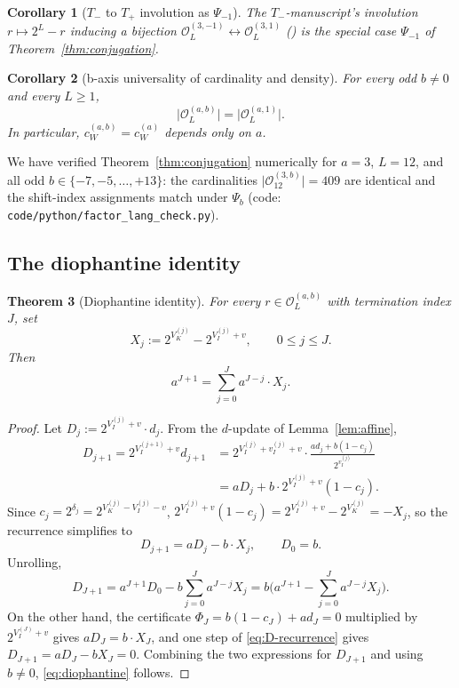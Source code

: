 \documentclass[11pt,reqno]{amsart}
\theoremstyle{plain}
\newtheorem{theorem}{Theorem}[section]
\newtheorem{corollary}[theorem]{Corollary}
\theoremstyle{definition}
\theoremstyle{remark}
\newcommand{\Tneg}{T_{-}}
\newcommand{\Tpos}{T_{+}}
\newcommand{\Obs}{\mathcal{O}}
\newcommand{\Vk}{V_{K}}
\newcommand{\Vi}{V_{I}}
\newcommand{\vi}{v_{I}}
\newcommand{\Psib}{\Psi_{b}}
\newcommand{\cWa}{c_{W}^{(a)}}
\newcommand{\cWab}{c_{W}^{(a,b)}}
\newcommand{\Obsab}{\Obs_{L}^{(a,b)}}
\newcommand{\srcpath}[1]{\nolinkurl{#1}}
\begin{document}
\begin{corollary}[$\Tneg$ to $\Tpos$ involution as $\Psi_{-1}$]\label{cor:involution}
The $\Tneg$-manuscript's involution $r \mapsto 2^L - r$ inducing a bijection
$\Obs_L^{(3,-1)} \leftrightarrow \Obs_L^{(3,1)}$
(\cite[Section~7]{ObstructionResidues2026}) is the special case $\Psi_{-1}$ of
Theorem~\ref{thm:conjugation}.
\end{corollary}

\begin{corollary}[b-axis universality of cardinality and density]\label{cor:b-universality}
For every odd $b \ne 0$ and every $L \ge 1$,
\[
\lvert \Obsab \rvert = \lvert \Obs_L^{(a,1)} \rvert.
\]
In particular, $\cWab = \cWa$ depends only on $a$.
\end{corollary}

We have verified Theorem~\ref{thm:conjugation} numerically for
$a = 3$, $L = 12$, and all odd $b \in \{-7, -5, \ldots, +13\}$: the
cardinalities $\lvert \Obs_{12}^{(3, b)} \rvert = 409$ are identical and
the shift-index assignments match under $\Psib$
(code: \srcpath{code/python/factor_lang_check.py}).

\subsection{The diophantine identity}

\begin{theorem}[Diophantine identity]\label{thm:diophantine}
For every $r \in \Obsab$ with termination index $J$, set
\[
X_j := 2^{\Vk^{(j)}} - 2^{\Vi^{(j)} + v}, \qquad 0 \le j \le J.
\]
Then
\begin{equation}\label{eq:diophantine}
a^{J+1} = \sum_{j=0}^{J} a^{J-j} \cdot X_j.
\end{equation}
\end{theorem}

\begin{proof}
Let $D_j := 2^{\Vi^{(j)} + v} \cdot d_j$. From the $d$-update of
Lemma~\ref{lem:affine},
\begin{align*}
D_{j+1} = 2^{\Vi^{(j+1)} + v} d_{j+1}
  &= 2^{\Vi^{(j)} + \vi^{(j)} + v} \cdot \frac{a d_j + b(1 - c_j)}{2^{\vi^{(j)}}} \\
  &= a D_j + b \cdot 2^{\Vi^{(j)} + v}(1 - c_j).
\end{align*}
Since $c_j = 2^{\delta_j} = 2^{\Vk^{(j)} - \Vi^{(j)} - v}$,
$2^{\Vi^{(j)} + v}(1 - c_j) = 2^{\Vi^{(j)} + v} - 2^{\Vk^{(j)}} = -X_j$,
so the recurrence simplifies to
\begin{equation}\label{eq:D-recurrence}
D_{j+1} = a D_j - b \cdot X_j, \qquad D_0 = b.
\end{equation}
Unrolling,
\[
D_{J+1} = a^{J+1} D_0 - b \sum_{j=0}^{J} a^{J-j} X_j
       = b \biggl( a^{J+1} - \sum_{j=0}^{J} a^{J-j} X_j \biggr).
\]
On the other hand, the certificate $\Phi_J = b(1 - c_J) + a d_J = 0$
multiplied by $2^{\Vi^{(J)} + v}$ gives $a D_J = b \cdot X_J$, and one
step of \eqref{eq:D-recurrence} gives $D_{J+1} = a D_J - b X_J = 0$.
Combining the two expressions for $D_{J+1}$ and using $b \ne 0$,
\eqref{eq:diophantine} follows. \qedhere
\end{proof}
\end{document}
